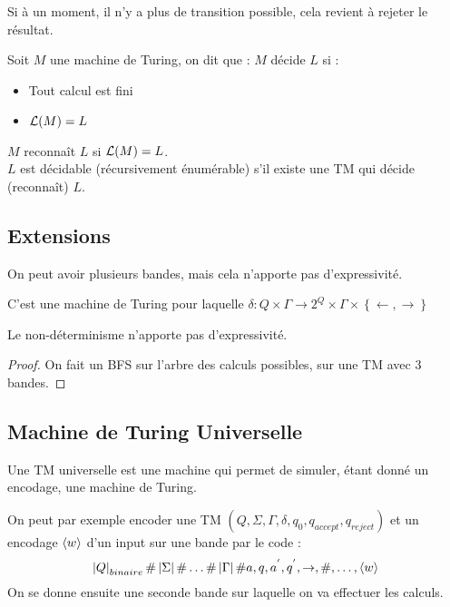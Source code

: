 \documentclass{cours}
\begin{document}
\begin{remark}
    Si à un moment, il n'y a plus de transition possible, cela revient à rejeter le résultat.
\end{remark}

\begin{definition}
    Soit $M$ une machine de Turing, on dit que : $M$ décide $L$ si :
    \begin{itemize}
        \item Tout calcul est fini
        \item $\mathcal{L}(M) = L$
    \end{itemize}
    $M$ reconnaît $L$ si $\mathcal{L}(M) = L$.\\
    $L$ est décidable (récursivement énumérable) s'il existe une TM qui décide (reconnaît) $L$.
\end{definition}

\subsection{Extensions}
On peut avoir plusieurs bandes, mais cela n'apporte pas d'expressivité.

\begin{definition}
    C'est une machine de Turing pour laquelle $\delta : Q \times \Gamma \rightarrow 2^{Q} \times \Gamma \times \left\{\leftarrow, \rightarrow\right\}$
\end{definition}

\begin{proposition}
    Le non-déterminisme n'apporte pas d'expressivité.
\end{proposition}
\begin{proof}
    On fait un BFS sur l'arbre des calculs possibles, sur une TM avec 3 bandes.
\end{proof}


\subsection{Machine de Turing Universelle}
\begin{definition}
    Une TM universelle est une machine qui permet de simuler, étant donné un encodage, une machine de Turing.    
\end{definition}

On peut par exemple encoder une TM $(Q, \Sigma, \Gamma, \delta, q_{0}, q_{accept}, q_{reject})$ et un encodage $\left\langle w \right\rangle$ d'un input sur une bande par le code :
\[
    \left|Q\right|_{binaire} \# \left|\Sigma\right| \# \ldots \# \left|\Gamma\right| \# a, q, a^{'}, q^{'}, \rightarrow, \#, \ldots, \left\langle w \right\rangle
\]
On se donne ensuite une seconde bande sur laquelle on va effectuer les calculs.
\end{document}
